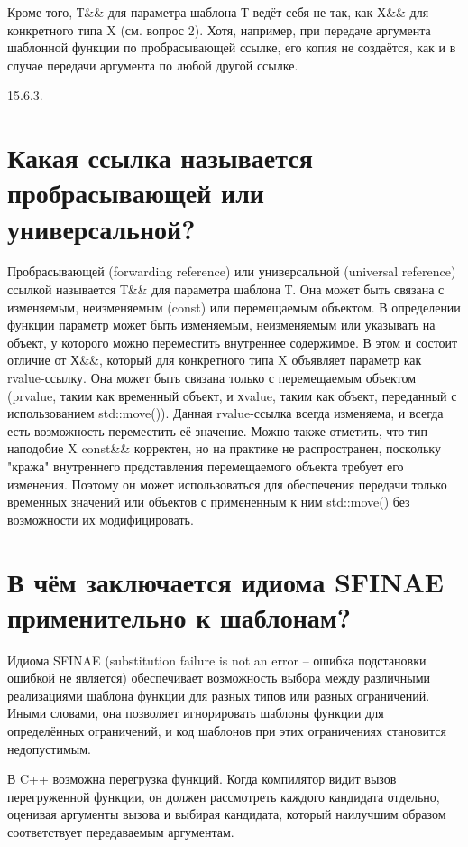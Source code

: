 \documentclass[a4paper,12pt]{article}	%
\begin{document}
	Кроме того, Т\&\& для параметра шаблона Т ведёт себя не так, как Х\&\& для конкретного типа X (см. вопрос 2). Хотя, например, при передаче аргумента шаблонной функции по пробрасывающей ссылке, его копия не создаётся, как и в случае передачи аргумента по любой другой ссылке. 
	
	15.6.3.	
	
\newpage

\section{Какая ссылка называется пробрасывающей или универсальной?}

	Пробрасывающей (forwarding reference) или универсальной (universal reference) ссылкой называется Т\&\& для параметра шаблона Т. Она может быть связана с изменяемым, неизменяемым (const) или перемещаемым объектом. В определении функции параметр может быть изменяемым, неизменяемым или указывать на объект, у которого можно переместить внутреннее содержимое. В этом и состоит отличие от Х\&\&, который для  конкретного типа X объявляет параметр как rvalue-ссылку. Она может быть связана только с перемещаемым объектом (prvalue, таким как временный объект, и хvalue, таким как объект, переданный с использованием std::move()). Данная rvalue-ссылка всегда изменяема, и всегда есть возможность переместить её значение. Можно также отметить, что тип наподобие X const\&\& корректен, но на практике не распространен, поскольку "кража" внутреннего представления перемещаемого объекта требует его изменения. Поэтому он может использоваться для обеспечения передачи только временных значений или объектов с примененным к ним std::move() без возможности их модифицировать.


		
\newpage

\section{В чём заключается идиома SFINAE применительно к шаблонам?}
	
	Идиома SFINAE (substitution failure is not an error -- ошибка подстановки ошибкой не является) обеспечивает возможность выбора между различными реализациями шаблона функции для разных типов или разных ограничений. Иными словами, она позволяет игнорировать шаблоны функции для определённых ограничений, и код шаблонов при этих ограничениях становится недопустимым.
	
	В C++ возможна перегрузка функций. Когда компилятор видит вызов перегруженной функции, он должен рассмотреть каждого кандидата отдельно, оценивая аргументы вызова и выбирая кандидата, который наилучшим образом соответствует передаваемым аргументам.
	
\end{document}
